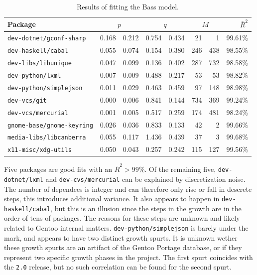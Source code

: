 \documentclass[smallextended,final]{svjour3}
\begin{document}
\begin{table}
\small\centering
\caption{Results of fitting the Bass model.}\label{tbl:testresults}
\begin{tabular}{lr@{ $\pm$}rr@{ $\pm$}rr@{ $\pm$}rr}
\toprule
Package & \multicolumn{2}{c}{$p$} & \multicolumn{2}{c}{$q$} & \multicolumn{2}{c}{$M$} & $\overline{R}^2$\\
\midrule
\texttt{dev-dotnet/gconf-sharp}   & 0.168 & 0.212 & 0.754 & 0.434 &  21 &   1 & 99.61\%\\
\texttt{dev-haskell/cabal}        & 0.055 & 0.074 & 0.154 & 0.380 & 246 & 438 & 98.55\%\\
\texttt{dev-libs/libunique}       & 0.047 & 0.099 & 0.136 & 0.402 & 287 & 732 & 98.58\%\\
\texttt{dev-python/lxml}          & 0.007 & 0.009 & 0.488 & 0.217 &  53 &  53 & 98.82\%\\
\texttt{dev-python/simplejson}    & 0.011 & 0.029 & 0.463 & 0.459 &  97 & 148 & 98.98\%\\
\texttt{dev-vcs/git}              & 0.000 & 0.006 & 0.841 & 0.144 & 734 & 369 & 99.24\%\\
\texttt{dev-vcs/mercurial}        & 0.001 & 0.005 & 0.517 & 0.259 & 174 & 481 & 98.24\%\\
\texttt{gnome-base/gnome-keyring} & 0.026 & 0.036 & 0.833 & 0.133 &  42 &   2 & 99.66\%\\
\texttt{media-libs/libcanberra}   & 0.055 & 0.117 & 1.436 & 0.439 &  37 &   3 & 99.68\%\\
\texttt{x11-misc/xdg-utils}       & 0.050 & 0.043 & 0.257 & 0.242 & 115 & 127 & 99.56\%\\
\bottomrule
\end{tabular}
\end{table}


Five packages are good fits with an $\overline{R}^2 > 99\%$. Of the remaining five, \texttt{dev-dotnet/lxml} and \texttt{dev-cvs/mercurial} can be explained by discretization noise. The number of dependees is integer and can therefore only rise or fall in descrete steps, this introduces additional variance. It also appears to happen in \texttt{dev-haskell/cabal}, but this is an illusion since the steps in the growth are in the order of tens of packages. The reasons for these steps are unknown and likely related to Gentoo internal matters. \texttt{dev-python/simplejson} is barely under the mark, and appears to have two distinct growth spurts. It is unknown wether these growth spurts are an artifact of the Gentoo Portage database, or if they represent two specific growth phases in the project. The first spurt coincides with the \texttt{2.0} release, but no such correlation can be found for the second spurt.
\end{document}
